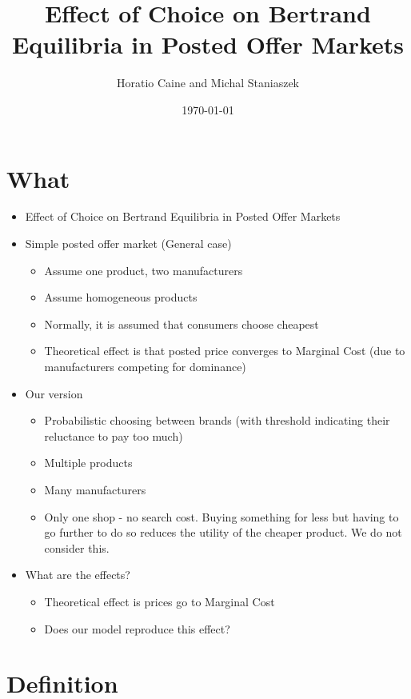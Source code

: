 \documentclass[11pt]{article}
\title{Effect of Choice on Bertrand Equilibria in Posted Offer Markets}
\author{Horatio Caine and Michal Staniaszek}
\date{\today}
\begin{document}
\maketitle


\section{What}
\label{sec-1}

\begin{itemize}
\item Effect of Choice on Bertrand Equilibria in Posted Offer Markets
\item Simple posted offer market (General case)
\begin{itemize}
\item Assume one product, two manufacturers
\item Assume homogeneous products
\item Normally, it is assumed that consumers choose cheapest
\item Theoretical effect is that posted price converges to Marginal Cost (due to manufacturers competing for dominance)
\end{itemize}
\end{itemize}

\begin{itemize}
\item Our version
\begin{itemize}
\item Probabilistic choosing between brands (with threshold indicating their reluctance to pay too much)
\item Multiple products
\item Many manufacturers
\item Only one shop - no search cost. Buying something for less but having to go further to do so reduces the utility of the cheaper product. We do not consider this.
\end{itemize}
\item What are the effects?
\begin{itemize}
\item Theoretical effect is prices go to Marginal Cost
\item Does our model reproduce this effect?
\end{itemize}
\end{itemize}
\section{Definition}
\label{sec-2}
\end{document}
